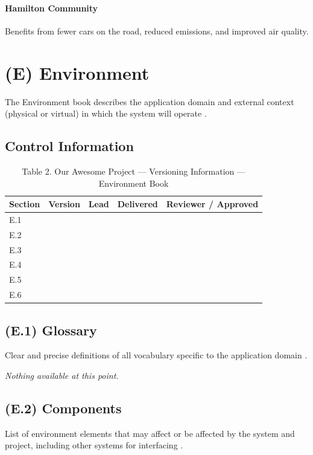 \documentclass[12pt,letterpaper]{article}
\begin{document}
\paragraph{Hamilton Community}
Benefits from fewer cars on the road, reduced emissions, and improved air quality.

\clearpage

\section{(E) Environment}
The Environment book describes the application domain and external context (physical or virtual) in which the system will operate \cite{meyer2022}.

\subsection*{Control Information}
\begin{table}[h!]\centering
\caption*{Table 2. Our Awesome Project --- Versioning Information --- Environment Book}
\renewcommand{\arraystretch}{1.1}
\begin{tabularx}{\textwidth}{@{}l l l l l@{}}
\toprule
\textbf{Section} & \textbf{Version} & \textbf{Lead} & \textbf{Delivered} & \textbf{Reviewer / Approved} \\
\midrule
E.1 & & & & \\
E.2 & & & & \\
E.3 & & & & \\
E.4 & & & & \\
E.5 & & & & \\
E.6 & & & & \\
\bottomrule
\end{tabularx}
\end{table}

\subsection{(E.1) Glossary}
Clear and precise definitions of all vocabulary specific to the application domain \cite{meyer2022}.

\textit{Nothing available at this point.}

\subsection{(E.2) Components}
List of environment elements that may affect or be affected by the system and project, including other systems for interfacing \cite{meyer2022}.
\end{document}

